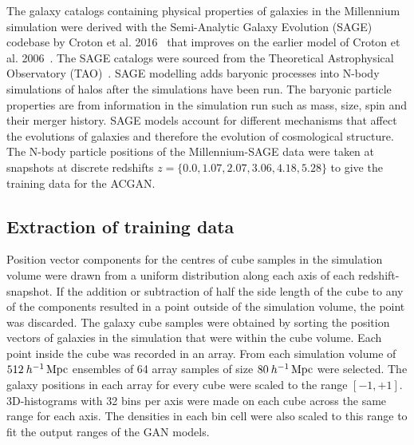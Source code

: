\documentclass[twocolumn]{article}
\numberwithin{equation}{section}
\begin{document}
The galaxy catalogs containing physical properties of galaxies in the Millennium simulation were derived with the 
Semi-Analytic Galaxy Evolution (SAGE) codebase by Croton et al. 2016~\cite{Croton2016} that improves on the earlier 
model of Croton et al. 2006~\cite{Croton2006}. The SAGE catalogs were sourced from the Theoretical Astrophysical 
Observatory (TAO)~\cite{TAO}. SAGE modelling adds baryonic processes into N-body simulations of halos after the 
simulations have been run. The baryonic particle properties are from information in the simulation run such as mass, 
size, spin and their merger history. SAGE models account for different mechanisms that affect the evolutions of 
galaxies and therefore the evolution of cosmological structure. The N-body particle positions of the Millennium-SAGE 
data were taken at snapshots at discrete redshifts $z=\{0.0, 1.07, 2.07, 3.06, 4.18, 5.28\}$ to give the training 
data for the ACGAN. 


\subsection{Extraction of training data} 
Position vector components for the centres of cube samples in the simulation volume were drawn from a uniform distribution 
along each axis of each redshift-snapshot. If the addition or subtraction of half the side length of the cube to any of 
the components resulted in a point outside of the simulation volume, the point was discarded. The galaxy cube samples were 
obtained by sorting the position vectors of galaxies in the simulation that were within the cube volume. Each point inside 
the cube was recorded in an array. From each simulation volume of $512 \: h^{-1} \,\textup{Mpc}$ ensembles of 64 array 
samples of size $80 \: h^{-1} \,\textup{Mpc}$ were selected. The galaxy positions in each array for every cube were scaled
to the range $[-1,+1]$. 3D-histograms with 32 bins per axis were made on each cube across the same range for each axis. 
The densities in each bin cell were also scaled to this range to fit the output ranges of the GAN models. 
\end{document}
